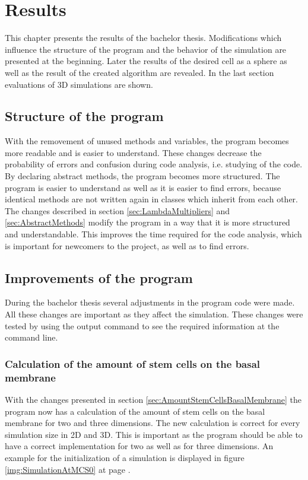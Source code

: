 \chapter{Results}
This chapter presents the results of the bachelor thesis. Modifications which influence the structure of the program and the behavior of the simulation are presented at the beginning. Later the results of the desired cell as a sphere as well as the result of the created algorithm are revealed. In the last section evaluations of 3D simulations are shown.

\section{Structure of the program}
With the removement of unused methods and variables, the program becomes more readable and is easier to understand. These changes decrease the probability of errors and confusion during code analysis, i.e. studying of the code. By declaring abstract methods, the program becomes more structured. The program is easier to understand as well as it is easier to find errors, because identical methods are not written again in classes which inherit from each other. \newline
The changes described in section \ref{sec:LambdaMultipliers} and \ref{sec:AbstractMethods} modify the program in a way that it is more structured and understandable. This improves the time required for the code analysis, which is important for newcomers to the project, as well as to find errors.


\section{Improvements of the program}
During the bachelor thesis several adjustments in the program code were made. All these changes are important as they affect the simulation. These changes were tested by using the output command to see the required information at the command line. 
\subsection{Calculation of the amount of stem cells on the basal membrane}
With the changes presented in section \ref{sec:AmountStemCellsBasalMembrane} the program now has a calculation of the amount of stem cells on the basal membrane for two and three dimensions. The new calculation is correct for every simulation size in 2D and 3D. This is important as the program should be able to have a correct implementation for two as well as for three dimensions. An example for the initialization of a simulation is displayed in figure \ref{img:SimulationAtMCS0} at page \pageref{img:SimulationAtMCS0}.
